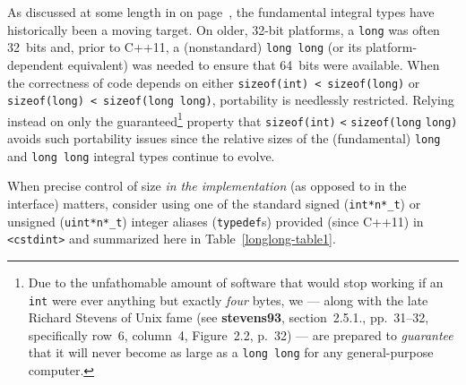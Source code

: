 As discussed at some length in {\it{}} on page~\pageref{longlong-appendix}, the
fundamental integral types have historically been a moving target. On
older, 32-bit platforms, a \texttt{long} was often 32~bits and, prior to
C++11, a (nonstandard) \texttt{long}~\texttt{long} (or its
platform-dependent equivalent) was needed to ensure that 64~bits were
available. When the correctness of code depends on either
\texttt{sizeof(int)}~\texttt{<}~\texttt{sizeof(long)} or
\texttt{sizeof(long)}~\texttt{<}~\texttt{sizeof(long}~\texttt{long)},
portability is needlessly restricted. Relying instead on only the
guaranteed{\cprotect\footnote{Due to the unfathomable amount of software
that would stop working if an \texttt{int} were ever anything but
exactly \emph{four} bytes, we --- along with the late Richard Stevens
of Unix fame (see \textbf{{stevens93}}, section~2.5.1., pp.~31--32, specifically row~6, column~4, Figure~2.2, p.~32) --- are prepared
to \emph{guarantee} that it will never become as large as a
\texttt{long}~\texttt{long} for any general-purpose computer.}}
property that
\texttt{sizeof(int)} \texttt{<} \texttt{sizeof(long} \texttt{long)}
avoids such portability issues since the relative sizes of the
(fundamental) \texttt{long} and \texttt{long}~\texttt{long} integral
types continue to evolve.

When precise control of size \emph{in the implementation} (as opposed to
in the interface) matters, consider using one of the standard signed
(\texttt{int*n*\_t}) or unsigned (\texttt{uint*n*\_t}) integer aliases
(\texttt{typedef}s) provided (since C++11) in \texttt{<cstdint>} and
summarized here in Table~\ref{longlong-table1}.\newpage

